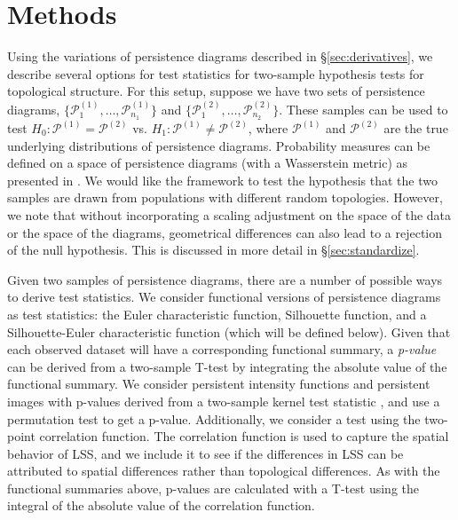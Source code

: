 \documentclass[12pt]{article}
\begin{document}

\section{Methods} \label{sec:methods}
\begin{sloppypar}
Using the variations of persistence diagrams described in \S \ref{sec:derivatives},
we describe several options for test statistics for two-sample hypothesis tests for topological structure.
For this setup, suppose we have two sets of persistence diagrams, $\{\mathcal P_1^{(1)}, \ldots, \mathcal P_{n_1}^{(1)}\}$ and $\{\mathcal P_1^{(2)}, \ldots, \mathcal P_{n_2}^{(2)}\}$.  These samples can be used to test $H_0: \mathcal
P^{(1)} = \mathcal P^{(2)}$ vs. $H_1: \mathcal P^{(1)} \neq \mathcal P^{(2)}$, where $\mathcal P^{(1)}$ and $\mathcal P^{(2)}$ are the true underlying distributions of persistence diagrams.  Probability measures can be defined on a space of persistence diagrams (with a Wasserstein metric) as presented in \citep{Mileyko:2011aa}. We would like the framework to test the hypothesis that the two samples are drawn from populations with different random topologies. However, we note that without incorporating a scaling adjustment on the space  of the data or the space of the diagrams, geometrical differences can also lead to a rejection of the null hypothesis. This is discussed in more detail in \S \ref{sec:standardize}.
\end{sloppypar}

Given two samples of persistence diagrams, there are a number of possible ways to derive test statistics. We consider functional versions of persistence diagrams as test statistics:  the Euler characteristic function, Silhouette function, and a Silhouette-Euler characteristic function (which will be defined below).
Given that each observed dataset will have a corresponding functional summary, a \emph{p-value} can be derived from a two-sample T-test by integrating the absolute value of the functional summary.
We consider persistent intensity functions and persistent images with p-values derived from a two-sample kernel test statistic \citep{gretton2012kernel}, and use a permutation test to get a p-value.
%
Additionally, we consider a test using the two-point correlation function.  The correlation function is used to capture the spatial behavior of LSS, and we include it to see if the differences in LSS can be attributed to spatial differences rather than topological differences.
As with the functional summaries above, p-values are calculated with a T-test using the integral of the absolute value of the correlation function.
\end{document}
